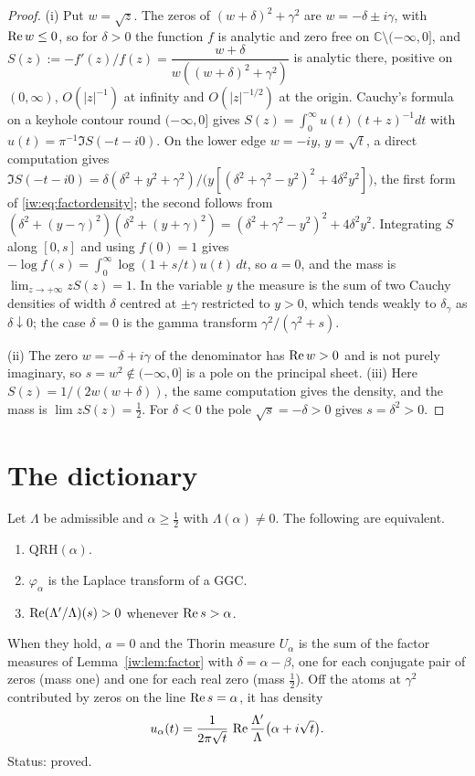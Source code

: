 \begin{proof}
(i) Put $w=\sqrt z$. The zeros of $(w+\delta)^2+\gamma^2$ are $w=-\delta\pm i\gamma$, with $\operatorname{Re} w\le0$, so for $\delta>0$ the function $f$ is analytic and zero free on $\mathbb C\setminus(-\infty,0]$, and $S(z):=-f'(z)/f(z)=\dfrac{w+\delta}{w((w+\delta)^2+\gamma^2)}$ is analytic there, positive on $(0,\infty)$, $O(|z|^{-1})$ at infinity and $O(|z|^{-1/2})$ at the origin. Cauchy's formula on a keyhole contour round $(-\infty,0]$ gives $S(z)=\int_0^\infty u(t)(t+z)^{-1}dt$ with $u(t)=\pi^{-1}\Im S(-t-i0)$. On the lower edge $w=-iy$, $y=\sqrt t$, a direct computation gives $\Im S(-t-i0)=\delta(\delta^2+y^2+\gamma^2)/\big(y[(\delta^2+\gamma^2-y^2)^2+4\delta^2y^2]\big)$, the first form of \eqref{iw:eq:factordensity}; the second follows from $(\delta^2+(y-\gamma)^2)(\delta^2+(y+\gamma)^2)=(\delta^2+\gamma^2-y^2)^2+4\delta^2y^2$. Integrating $S$ along $[0,s]$ and using $f(0)=1$ gives $-\log f(s)=\int_0^\infty\log(1+s/t)u(t)\,dt$, so $a=0$, and the mass is $\lim_{z\to+\infty}zS(z)=1$. In the variable $y$ the measure is the sum of two Cauchy densities of width $\delta$ centred at $\pm\gamma$ restricted to $y>0$, which tends weakly to $\delta_\gamma$ as $\delta\downarrow0$; the case $\delta=0$ is the gamma transform $\gamma^2/(\gamma^2+s)$.

(ii) The zero $w=-\delta+i\gamma$ of the denominator has $\operatorname{Re} w>0$ and is not purely imaginary, so $s=w^2\notin(-\infty,0]$ is a pole on the principal sheet. (iii) Here $S(z)=1/(2w(w+\delta))$, the same computation gives the density, and the mass is $\lim zS(z)=\frac12$. For $\delta<0$ the pole $\sqrt s=-\delta>0$ gives $s=\delta^2>0$.
\end{proof}

\section{The dictionary}\label{iw:sec:dictionary}

\begin{theorem}\label{iw:thm:dictionary}
Let $\Lambda$ be admissible and $\alpha\ge\frac12$ with $\Lambda(\alpha)\ne0$. The following are equivalent.
\begin{enumerate}
\item[(a)] $\mathrm{QRH}(\alpha)$.
\item[(b)] $\varphi_\alpha$ is the Laplace transform of a GGC.
\item[(c)] $\operatorname{Re}(\Lambda'/\Lambda)(s)>0$ whenever $\operatorname{Re} s>\alpha$.
\end{enumerate}
When they hold, $a=0$ and the Thorin measure $U_\alpha$ is the sum of the factor measures of Lemma~\ref{iw:lem:factor} with $\delta=\alpha-\beta$, one for each conjugate pair of zeros (mass one) and one for each real zero (mass $\frac12$). Off the atoms at $\gamma^2$ contributed by zeros on the line $\operatorname{Re} s=\alpha$, it has density
\begin{equation}\label{iw:eq:thorindensity}
u_\alpha(t)=\frac1{2\pi\sqrt t}\,\operatorname{Re}\frac{\Lambda'}{\Lambda}\big(\alpha+i\sqrt t\big).
\end{equation}
Status: proved.
\end{theorem}


